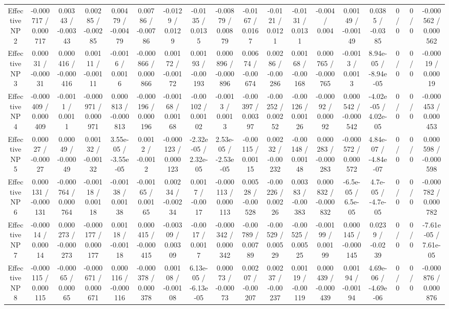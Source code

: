 \documentclass[10pt]{article}
\begin{document}
\begin{table}[htbp]
\begin{center}
\begin{tabular}{|c|c|c|c|c|c|c|c|c|c|c|c|c|c|c|c|c|c|}
  Effective NP 2 & -0.000717 / 0.000717 & 0.00343 / -0.00343 & 0.00285 / -0.00285 & 0.00479 / -0.00479 & 0.00786 / -0.00786 & -0.0129 / 0.0129 & -0.0135 / 0.0135 & -0.00879 / 0.00879 & -0.0167 / 0.0167 & -0.0121 / 0.0121 & -0.0131 / 0.0131 & -0.004 / 0.004 & 0.00149 / -0.00149 & 0.0385 / -0.0385 & 0 / 0 & 0 / 0 & -0.000562 / 0.000562 \\ 
  Effective NP 3 & 0.00031 / -0.00031 & 0.000416 / -0.000416 & 0.00111 / -0.00111 & -0.0016 / 0.0016 & -0.000866 / 0.000866 & 0.00172 / -0.00172 & 0.00193 / -0.00193 & 0.000896 / -0.000896 & 0.00674 / -0.00674 & 0.00286 / -0.00286 & 0.00168 / -0.00168 & 0.000765 / -0.000765 & -0.0013 / 0.0013 & 8.94e-05 / -8.94e-05 & 0 / 0 & 0 / 0 & -0.00019 / 0.00019 \\ 
  Effective NP 4 & -0.000409 / 0.000409 & -0.0011 / 0.0011 & -0.000971 / 0.000971 & 0.000813 / -0.000813 & -0.000196 / 0.000196 & -0.00168 / 0.00168 & -0.00102 / 0.00102 & -0.0013 / 0.0013 & -0.00397 / 0.00397 & -0.00252 / 0.00252 & -0.00126 / 0.00126 & -0.00092 / 0.00092 & 0.000542 / -0.000542 & -4.02e-05 / 4.02e-05 & 0 / 0 & 0 / 0 & -0.000453 / 0.000453 \\ 
  Effective NP 5 & 0.00027 / -0.00027 & 0.00049 / -0.00049 & 0.00132 / -0.00132 & 3.55e-05 / -3.55e-05 & 0.0012 / -0.0012 & -0.000123 / 0.000123 & -2.32e-05 / 2.32e-05 & 2.53e-05 / -2.53e-05 & -0.00115 / 0.00115 & 0.00232 / -0.00232 & -0.00148 / 0.00148 & 0.000283 / -0.000283 & -0.000572 / 0.000572 & 4.84e-07 / -4.84e-07 & 0 / 0 & 0 / 0 & 0.000598 / -0.000598 \\ 
  Effective NP 6 & 0.000131 / -0.000131 & -0.000764 / 0.000764 & -0.00118 / 0.00118 & -0.00138 / 0.00138 & -0.00165 / 0.00165 & 0.00234 / -0.00234 & 0.0017 / -0.0017 & -0.000113 / 0.000113 & 0.00528 / -0.00528 & -0.00226 / 0.00226 & 0.00383 / -0.00383 & 0.000832 / -0.000832 & -6.5e-05 / 6.5e-05 & 4.7e-05 / -4.7e-05 & 0 / 0 & 0 / 0 & -0.000782 / 0.000782 \\ 
  Effective NP 7 & -0.00014 / 0.00014 & 0.000273 / -0.000273 & -0.000177 / 0.000177 & 0.00118 / -0.00118 & 0.000415 / -0.000415 & -0.00309 / 0.00309 & -0.0017 / 0.0017 & -0.000342 / 0.000342 & -0.00789 / 0.00789 & -0.00529 / 0.00529 & -0.00525 / 0.00525 & -0.00199 / 0.00199 & 0.000145 / -0.000145 & 0.0239 / -0.0239 & 0 / 0 & 0 / 0 & -7.61e-05 / 7.61e-05 \\ 
  Effective NP 8 & -0.000115 / 0.000115 & -0.00065 / 0.00065 & -0.000671 / 0.000671 & 0.000116 / -0.000116 & -0.000378 / 0.000378 & 0.00108 / -0.00108 & 6.13e-05 / -6.13e-05 & 0.00073 / -0.00073 & 0.00207 / -0.00207 & 0.00237 / -0.00237 & 0.00119 / -0.00119 & 0.000439 / -0.000439 & 0.00194 / -0.00194 & 4.69e-06 / -4.69e-06 & 0 / 0 & 0 / 0 & -0.000876 / 0.000876 \\ 

\end{tabular}
\end{center}
\end{table}
\end{document}
